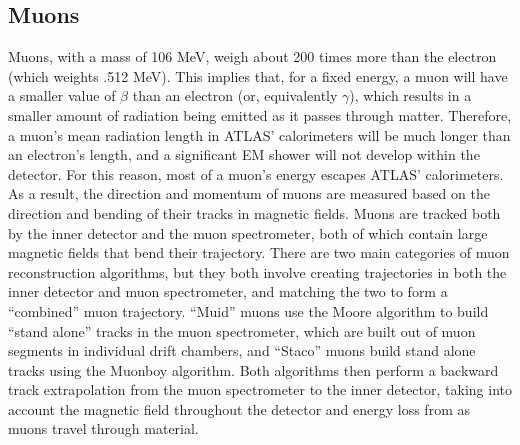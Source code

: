 \subsection{Muons}
Muons, with a mass of 106 MeV, weigh about 200 times more than the electron (which weights .512 MeV).
This implies that, for a fixed energy, a muon will have a smaller value of $\beta$ than an electron (or, equivalently $\gamma$), which results in a smaller amount of radiation being emitted as it passes through matter.
Therefore, a muon's mean radiation length in ATLAS' calorimeters will be much longer than an electron's length, and a significant EM shower will not develop within the detector.
For this reason, most of a muon's energy escapes ATLAS' calorimeters.
As a result, the direction and momentum of muons are measured based on the direction and bending of their tracks in magnetic fields.
Muons are tracked both by the inner detector and the muon spectrometer, both of which contain large magnetic fields that bend their trajectory.
There are two main categories of muon reconstruction algorithms, but they both involve creating trajectories in both the inner detector and muon spectrometer, and matching the two to form a ``combined'' muon trajectory.
``Muid'' muons use the Moore algorithm to build ``stand alone'' tracks in the muon spectrometer, which are built out of muon segments in individual drift chambers, and ``Staco'' muons build stand alone tracks using the Muonboy algorithm.
Both algorithms then perform a backward track extrapolation from the muon spectrometer to the inner detector, taking into account the magnetic field throughout the detector and energy loss from as muons travel through material.





